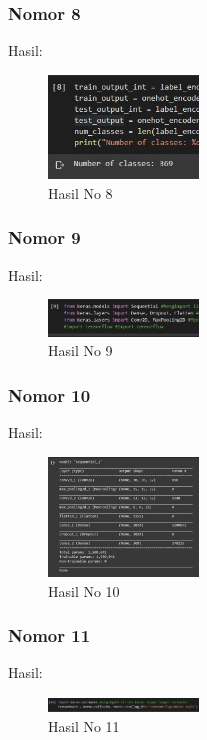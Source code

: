 \subsubsection{Nomor 8}
\hfill\break

Hasil:
\begin{figure}[H]
\centering
	\includegraphics[width=4cm]{figures/1174053/7/no8.jpg}
	\caption{Hasil No 8}
\end{figure}

\subsubsection{Nomor 9}
\hfill\break

Hasil:
\begin{figure}[H]
\centering
	\includegraphics[width=4cm]{figures/1174053/7/no9.jpg}
	\caption{Hasil No 9}
\end{figure}

\subsubsection{Nomor 10}
\hfill\break

Hasil:
\begin{figure}[H]
\centering
	\includegraphics[width=4cm]{figures/1174053/7/no10.jpg}
	\caption{Hasil No 10}
\end{figure}

\subsubsection{Nomor 11}
\hfill\break

Hasil:
\begin{figure}[H]
\centering
	\includegraphics[width=4cm]{figures/1174053/7/no11.jpg}
	\caption{Hasil No 11}
\end{figure}

